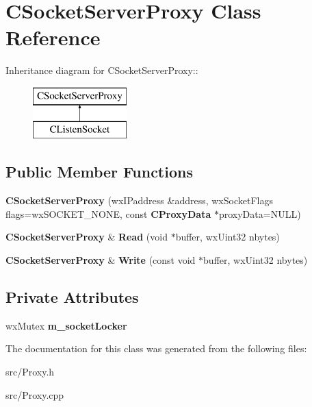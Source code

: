 \section{CSocketServerProxy Class Reference}
\label{classCSocketServerProxy}
Inheritance diagram for CSocketServerProxy::\begin{figure}[H]
\begin{center}
\leavevmode
\includegraphics[height=2cm]{classCSocketServerProxy}
\end{center}
\end{figure}
\subsection*{Public Member Functions}
\begin{DoxyCompactItemize}
\item 
{\bfseries CSocketServerProxy} (wxIPaddress \&address, wxSocketFlags flags=wxSOCKET\_\-NONE, const {\bf CProxyData} $\ast$proxyData=NULL)\label{classCSocketServerProxy_a4aa998ef2dccd8bfe4ea2184647f79e5}

\item 
{\bf CSocketServerProxy} \& {\bfseries Read} (void $\ast$buffer, wxUint32 nbytes)\label{classCSocketServerProxy_a707d14717c967c119cdd8114616c6560}

\item 
{\bf CSocketServerProxy} \& {\bfseries Write} (const void $\ast$buffer, wxUint32 nbytes)\label{classCSocketServerProxy_a31fa8086435b303c7772d4e1f87a72ca}

\end{DoxyCompactItemize}
\subsection*{Private Attributes}
\begin{DoxyCompactItemize}
\item 
wxMutex {\bfseries m\_\-socketLocker}\label{classCSocketServerProxy_a8274cb06669eacbf5b58360e50d78168}

\end{DoxyCompactItemize}


The documentation for this class was generated from the following files:\begin{DoxyCompactItemize}
\item 
src/Proxy.h\item 
src/Proxy.cpp\end{DoxyCompactItemize}

